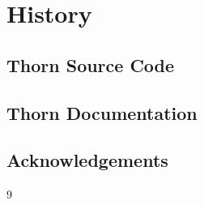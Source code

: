 \section{History}

\subsection{Thorn Source Code}

\subsection{Thorn Documentation}

\subsection{Acknowledgements}


\begin{thebibliography}{9}

\end{thebibliography}




